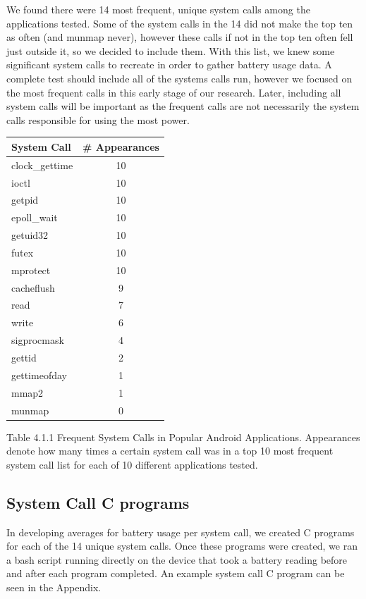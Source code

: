 \documentclass[11pt]{article}
\begin{document}
We found there were 14 most frequent, unique system calls among the applications tested.  Some of the 
system calls in the 14 did not make the top ten as often (and munmap never), however these calls if 
not in the top ten often fell just outside it, so we decided to include them.  With this list, we knew 
some significant system calls to recreate in order to gather battery usage data.  A complete test 
should include all of the systems calls run, however we focused on the most frequent calls in 
this early stage of our research.  Later, including all system calls will be important as the frequent 
calls are not necessarily the system calls responsible for using the most power. 
\newline
\begin{tabular}{l c}
   System Call & \# Appearances \\
   \hline
   clock\_gettime & 10 \\
   ioctl & 10 \\
   getpid & 10 \\
   epoll\_wait & 10 \\
   getuid32 & 10 \\
   futex & 10 \\
   mprotect & 10 \\
   cacheflush & 9 \\
   read & 7 \\
   write & 6 \\
   sigprocmask & 4 \\
   gettid & 2 \\
   gettimeofday & 1 \\
   mmap2 & 1 \\
   munmap & 0 \\ 
\end{tabular}
\newline
{\fontsize{11}{13}\selectfont Table 4.1.1 Frequent System Calls in Popular Android Applications. Appearances denote how many
times a certain system call was in a top 10 most frequent system call list for each of 10 different applications tested.}
\newline

\subsection{System Call C programs}

In developing averages for battery usage per system call, we created C programs for each of the 14 unique system 
calls.  Once these programs were created, we ran a bash script running directly on the device that took a battery 
reading before and after each program completed.  An example system call C program can be seen in the Appendix.  
\end{document}

